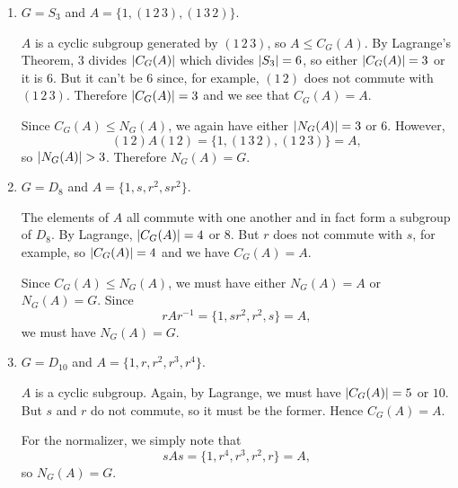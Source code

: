 \begin{enumerate}
\item $G = S_3$ and $A = \{1, (1\,2\,3), (1\,3\,2)\}$.
  \begin{solution}
    $A$ is a cyclic subgroup generated by $(1\,2\,3)$, so
    $A\leq C_G(A)$. By Lagrange's Theorem, $3$ divides $\lvert{C_G(A)}\rvert$
    which divides $\lvert{S_3}\rvert = 6$, so either $\lvert{C_G(A)}\rvert = 3$ or it
    is $6$. But it can't be $6$ since, for example, $(1\,2)$ does not
    commute with $(1\,2\,3)$. Therefore $\lvert{C_G(A)}\rvert = 3$ and we see
    that $C_G(A) = A$.

    Since $C_G(A)\leq N_G(A)$, we again have either $\lvert{N_G(A)}\rvert = 3$
    or $6$. However,
    \begin{equation*}
      (1\,2)A(1\,2) = \{1, (1\,3\,2), (1\,2\,3)\} = A,
    \end{equation*}
    so $\lvert{N_G(A)}\rvert > 3$. Therefore $N_G(A) = G$.
  \end{solution}
\item $G = D_8$ and $A = \{1, s, r^2, sr^2\}$.
  \begin{solution}
    The elements of $A$ all commute with one another and in fact form
    a subgroup of $D_8$. By Lagrange, $\lvert{C_G(A)}\rvert = 4$ or $8$. But
    $r$ does not commute with $s$, for example, so $\lvert{C_G(A)}\rvert = 4$
    and we have $C_G(A) = A$.

    Since $C_G(A)\leq N_G(A)$, we must have either $N_G(A) = A$ or
    $N_G(A) = G$. Since
    \begin{equation*}
      rAr^{-1} = \{ 1, sr^2, r^2, s \} = A,
    \end{equation*}
    we must have $N_G(A) = G$.
  \end{solution}
\item $G = D_{10}$ and $A = \{1, r, r^2, r^3, r^4\}$.
  \begin{solution}
    $A$ is a cyclic subgroup. Again, by Lagrange, we must have
    $\lvert{C_G(A)}\rvert = 5$ or $10$. But $s$ and $r$ do not commute, so it
    must be the former. Hence $C_G(A) = A$.

    For the normalizer, we simply note that
    \begin{equation*}
      sAs = \{ 1, r^4, r^3, r^2, r\} = A,
    \end{equation*}
    so $N_G(A) = G$.
  \end{solution}
\end{enumerate}


